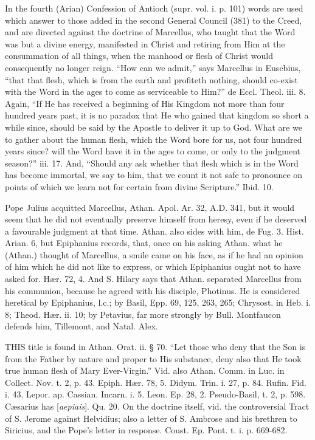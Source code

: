 In the fourth (Arian) Confession of Antioch (supr.
vol. i. p. 101) words are used which answer to those added in the
second General Council (381) to the Creed, and are directed
against the doctrine of Marcellus, who taught that the Word was but a
divine energy, manifested in Christ and retiring from Him at the
consummation of all things, when the manhood or flesh of Christ would
consequently no longer reign. ``How can we admit,'' says Marcellus in
Eusebius, ``that that flesh, which is from the earth and profiteth
nothing, should co-exist with the Word in the ages to come as
serviceable to Him?'' de Eccl. Theol. iii. 8. Again, ``If He has
received a beginning of His Kingdom not more than four hundred years
past, it is no paradox that He who gained that kingdom so short a
while since, should be said by the Apostle to deliver it up to God.
What are we to gather about the human flesh, which the Word bore for
us, not four hundred years since? will the Word have it in the ages to
come, or only to the judgment season?'' iii. 17. And, ``Should any ask
whether that flesh which is in the Word has become immortal, we say to
him, that we count it not safe to pronounce on points of which we
learn not for certain from divine Scripture.'' Ibid. 10.

Pope Julius acquitted Marcellus, Athan. Apol. Ar.
32, A.D.
341, but it would seem that he did not eventually preserve himself
from heresy, even if he deserved a favourable judgment at that time.
Athan. also sides with him, de Fug. 3. Hist. Arian. 6, but Epiphanius
records, that, once on his asking Athan. what he (Athan.) thought of
Marcellus, a smile came on his face, as if he had an opinion of him
which he did not like to express, or which Epiphanius ought not to
have asked for. Hær. 72, 4. And S. Hilary says that Athan.
separated Marcellus from his communion, because he agreed with his
disciple, Photinus. He is considered heretical by Epiphanius, l.c.; by
Basil, Epp. 69, 125, 263, 265; Chrysost. in Heb. i. 8; Theod. Hær.
ii. 10; by Petavius, far more strongly by Bull. Montfaucon defends
him, Tillemont, and Natal. Alex.



THIS
title is found in Athan. Orat. ii. § 70. ``Let those who deny that the
Son is from the Father by nature and proper to His substance, deny
also that He took true human flesh of Mary Ever-Virgin.'' Vid. also
Athan. Comm. in Luc. in Collect. Nov. t. 2, p. 43. Epiph. Hær. 78, 5.
Didym. Trin. i. 27, p. 84. Rufin. Fid. i. 43. Lepor. ap. Cassian.
Incarn. i. 5. Leon. Ep. 28, 2. Pseudo-Basil, t. 2, p. 598. Cæsarius
has [\emph{aepiais}]. Qu. 20. On the doctrine itself, vid. the
controversial Tract of S. Jerome against Helvidius; also a letter of
S. Ambrose and his brethren to Siricius, and the Pope's letter in
response. Coust. Ep. Pont. t. i. p. 669-682.

